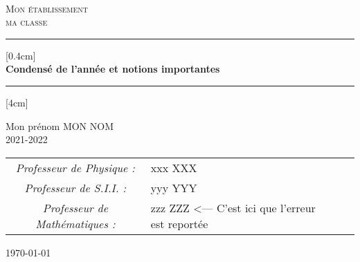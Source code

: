\documentclass[11pt]{article}
\begin{document}
\begin{titlepage}
    \begin{sffamily}
    \begin{center}
    ~\\[1.5cm]
        \textsc{\Large Mon établissement}\\[2cm]
        \textsc{\large ma classe}\\[1.5cm]
        \hrule[0.4cm] \\
        {\huge \bfseries Condensé de l'année et notions importantes\\[0.4cm]}
        \hrule[4cm] \\
        \vfill
        \begin{minipage}{0.3\textwidth}
            \begin{flushleft}\large
            Mon prénom \textsc{MON NOM}\\
            2021-2022
            \end{flushleft}
        \end{minipage}
        \begin{minipage}{0.5\textwidth}
            \begin{flushright}\large
            \begin{tabular}{Sl Sl}
              \emph{Professeur de Physique :}     &xxx \textsc{XXX}\\
              \emph{Professeur de S.I.I. :}       &yyy \textsc{YYY}\\
              \emph{Professeur de Mathématiques :}&zzz \textsc{ZZZ} <--- C'est ici que l'erreur est reportée
            \end{tabular}
            \end{flushright}
        \end{minipage}
        \vfill
        \large \today
    \end{center}
    \end{sffamily}
\end{titlepage}

\titlepage
\end{document}
